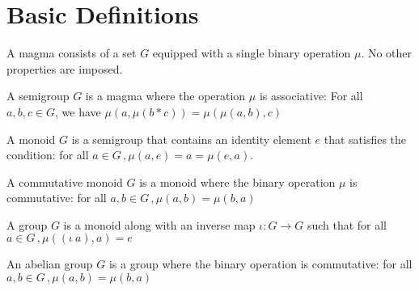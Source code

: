 \chapter{Basic Definitions}

\begin{definition}[Magma]
    \label{definition : magma}
    \leanok 
    A magma consists of a set $G$ equipped with a single binary operation $\mu$. 
    No other properties are imposed.
\end{definition}

\begin{definition}[Semigroup]
  \label{definition : semigroup}
  \leanok 
  A semigroup $G$ is a magma where the operation $\mu$ is associative: 
  For all $a, b, c \in G$, we have $\mu(a , \mu (b * c)) = \mu(\mu(a, b), c)$
\end{definition}

\begin{definition}[Monoid]
  \label{definition : monoid}
  \leanok 
  A monoid $G$ is a semigroup that contains an identity element $e$ that satisfies the condition:
  for all $a \in G\, , \mu(a, e) = a = \mu(e, a)$.
\end{definition}

\begin{definition}
  \label{definition: commutative monoid}
  \leanok 
  A commutative monoid $G$ is a monoid where the binary operation $\mu$ is commutative: 
  for all $a, b \in G\, , \mu (a, b) = \mu(b, a)$
\end{definition}

\begin{definition}[Group]
  \label{definition: group}
  \leanok 
  A group $G$ is a monoid along with an inverse map $\iota : G \to G$ such that  
  for all $a \in G\, , \mu ((\iota~a), a) = e$
\end{definition}

\begin{definition}
  \label{definition: abelian group}
  \leanok 
  An abelian group $G$ is a group where the binary operation is commutative:
  for all $a, b \in G\, , \mu (a, b) = \mu(b, a)$
\end{definition}